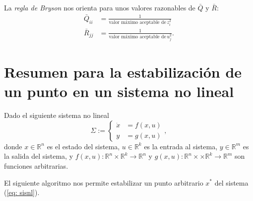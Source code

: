 La \emph{regla de Bryson} nos orienta para unos valores razonables de $\bar Q$ y $\bar R$:
\begin{align}
	\bar Q_{ii} &= \frac{1}{\text{valor máximo aceptable de}\, z_i^2} \nonumber \\
	\bar R_{jj} &= \frac{1}{\text{valor máximo aceptable de}\, u_j^2}. \nonumber
\end{align}


\section{Resumen para la estabilización de un punto en un sistema no lineal}
Dado el siguiente sistema no lineal
\begin{equation}
	\Sigma :=
\begin{cases}
	\dot x &= f(x,u) \\
	y &= g(x,u)
\end{cases}, \label{eq: sisnl}
\end{equation}
donde $x\in\mathbb{R}^n$ es el estado del sistema, $u\in\mathbb{R}^k$ es la entrada al sistema, $y\in\mathbb{R}^m$ es la salida del sistema, y $f(x,u): \mathbb{R}^n\times\mathbb{R}^k \to \mathbb{R}^n$ y  $g(x,u): \mathbb{R}^n\times \times\mathbb{R}^k \to \mathbb{R}^m$ son funciones arbitrarias.

El siguiente algoritmo nos permite estabilizar un punto arbitrario $x^*$ del sistema (\ref{eq: sisnl}).

